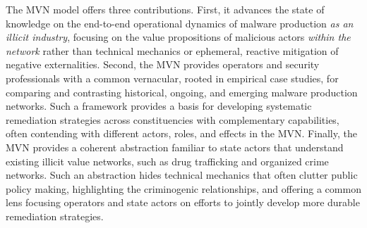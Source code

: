 \documentclass[12pt,journal,compsoc,letterpaper,onecolumn,twoside]{IEEEtran}
\begin{document}
%
The MVN model offers three contributions.
%
First, it advances the state of knowledge on the end-to-end
operational dynamics of 
malware production \emph{as an illicit industry}, focusing on the value
propositions of malicious actors \emph{within the network} rather than
technical mechanics or 
ephemeral, reactive mitigation of negative externalities.
%
Second, the MVN provides operators and security
professionals with a common vernacular, rooted in empirical case
studies, for comparing and contrasting historical, ongoing, and
emerging malware production networks.
%
Such a framework provides a basis for developing systematic
remediation strategies across constituencies with complementary
capabilities, often contending with different
actors, roles, and effects in the MVN.
%
Finally, the MVN provides a coherent abstraction
familiar to state actors that understand existing illicit value
networks, such as drug trafficking and 
organized crime networks.
%
Such an abstraction hides technical mechanics that often clutter
public policy making, highlighting the criminogenic relationships, and
offering a common lens focusing operators and 
state actors on efforts to jointly develop more durable remediation
strategies.




\balance



\end{document}
